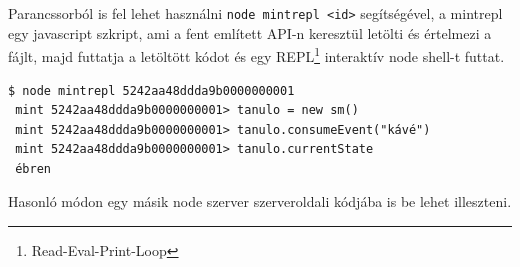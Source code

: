 Parancssorból is fel lehet használni \lstinline{node mintrepl <id>} segítségével, a mintrepl egy javascript szkript, ami a fent említett API-n keresztül letölti és értelmezi a fájlt, majd futtatja a letöltött kódot és egy REPL\footnote{Read-Eval-Print-Loop} interaktív node shell-t futtat. 

\begin{lstlisting}[caption=A generált kód felhasználása NodeJS shellben]
 $ node mintrepl 5242aa48ddda9b0000000001
 mint 5242aa48ddda9b0000000001> tanulo = new sm()
 mint 5242aa48ddda9b0000000001> tanulo.consumeEvent("kávé")
 mint 5242aa48ddda9b0000000001> tanulo.currentState
 ébren
 \end{lstlisting}

 Hasonló módon egy másik node szerver szerveroldali kódjába is be lehet illeszteni. 
 





